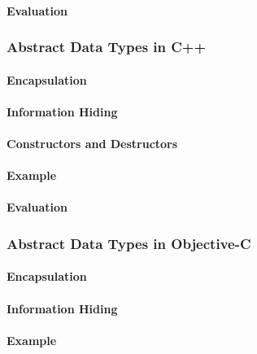 \paragraph{Evaluation}\label{par:Ada_Abstract_Data_Type_Evaluation}

\subsubsection{Abstract Data Types in C++}\label{subsubsec:Abstract_Data_Types_C++}
\paragraph{Encapsulation}\label{par:C++_Encapsulation}
\paragraph{Information Hiding}\label{par:C++_Info_Hiding}
\paragraph{Constructors and Destructors}\label{par:C++_Constructors_Destructors}
\paragraph{Example}\label{par:C++_Abstract_Data_Type_Example}
\paragraph{Evaluation}\label{par:C++_Abstract_Data_Type_Evaluation}

\subsubsection{Abstract Data Types in Objective-C}\label{subsubsec:Abstract_Data_Types_Objective_C}
\paragraph{Encapsulation}\label{par:Objective_C_Encapsulation}
\paragraph{Information Hiding}\label{par:Objective_C_Info_Hiding}
\paragraph{Example}\label{par:Objective_C_Abstract_Data_Type_Example}
